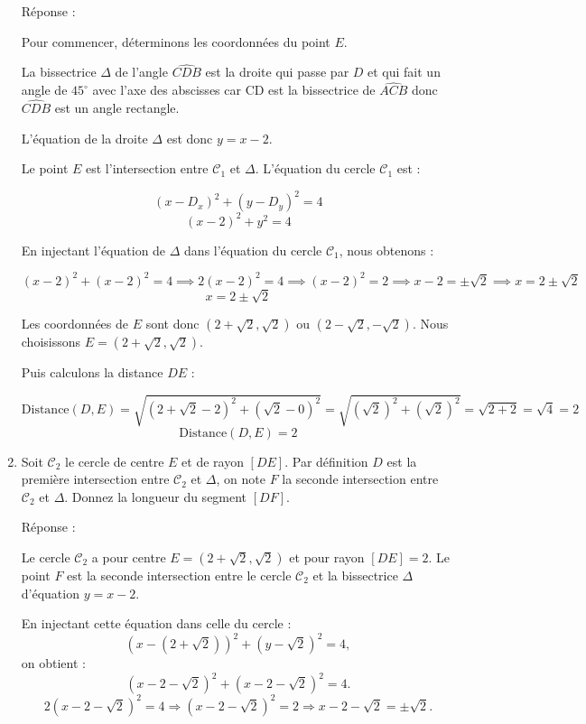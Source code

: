 \documentclass[a4paper,12pt]{article}
\begin{document}
\begin{enumerate}
Réponse :

  Pour commencer, déterminons les coordonnées du point $E$.

  La bissectrice $\Delta$ de l'angle $\widehat{CDB}$ est la droite qui passe par $D$ et qui fait un angle de $45^\circ$ avec l'axe des abscisses car CD est la bissectrice de $\widehat{ACB}$ donc $\widehat{CDB}$ est un angle rectangle.

  L'équation de la droite $\Delta$ est donc $y = x - 2$.

  Le point $E$ est l'intersection entre $\mathcal{C}_1$ et $\Delta$. L'équation du cercle $\mathcal{C}_1$ est :

  \[
  (x-D_x)^2 + (y-D_y)^2 = 4
  \]
  \[
  (x-2)^2 + y^2 = 4
  \]

  En injectant l'équation de $\Delta$ dans l'équation du cercle $\mathcal{C}_1$, nous obtenons :

  \[
  (x-2)^2 + (x-2)^2 = 4 \implies 2(x-2)^2 = 4 \implies (x-2)^2 = 2 \implies x-2 = \pm \sqrt{2} \implies x = 2 \pm \sqrt{2}
  \]
  \[
  \boxed{
   x = 2 \pm \sqrt{2}
  }
  \]

  Les coordonnées de $E$ sont donc $(2 + \sqrt{2}, \sqrt{2})$ ou $(2 - \sqrt{2}, -\sqrt{2})$. Nous choisissons $E = (2 + \sqrt{2}, \sqrt{2})$.

  Puis calculons la distance $DE$ :

  \[
  \text{Distance}(D, E) = \sqrt{(2 + \sqrt{2} - 2)^2 + (\sqrt{2} - 0)^2} = \sqrt{(\sqrt{2})^2 + (\sqrt{2})^2} = \sqrt{2 + 2} = \sqrt{4} = 2
  \]
  \[
  \boxed{
  \text{Distance}(D, E) = 2
  }
  \]
\newline
   \item Soit $\mathcal{C}_2$ le cercle de centre $E$ et de rayon $[DE]$. Par définition $D$ est la première intersection entre $\mathcal{C}_2$ et $\Delta$, on note $F$ la seconde intersection entre $\mathcal{C}_2$ et $\Delta$. Donnez la longueur du segment $[DF]$. 

Réponse :

  Le cercle $\mathcal{C}_2$ a pour centre $E = \left(2 + \sqrt{2}, \sqrt{2} \right)$ et pour rayon $[DE] = 2$. Le point $F$ est la seconde intersection entre le cercle $\mathcal{C}_2$ et la bissectrice $\Delta$ d'équation $y = x - 2$.

  \medskip

  En injectant cette équation dans celle du cercle :
  \[
  (x - (2 + \sqrt{2}))^2 + (y - \sqrt{2})^2 = 4,
  \]
  on obtient :
  \[
  (x - 2 - \sqrt{2})^2 + (x - 2 - \sqrt{2})^2 = 4.
  \]
  \[
  2(x - 2 - \sqrt{2})^2 = 4 \Rightarrow (x - 2 - \sqrt{2})^2 = 2 \Rightarrow x - 2 - \sqrt{2} = \pm \sqrt{2}.
  \]


\end{enumerate}
\end{document}

